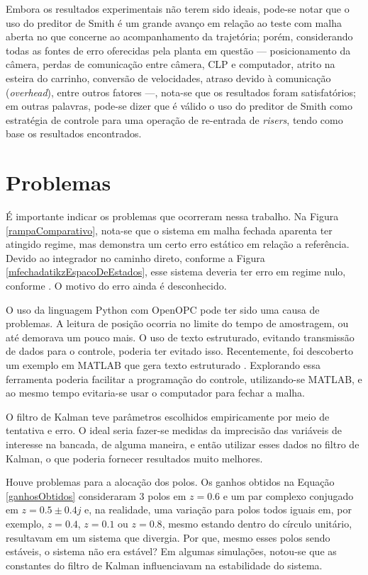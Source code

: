 Embora os resultados experimentais não terem sido ideais, pode-se notar que o uso do preditor de Smith é um grande avanço em relação ao teste com malha aberta no que concerne ao acompanhamento da trajetória; porém, considerando todas as fontes de erro oferecidas pela planta em questão --- posicionamento da câmera, perdas de comunicação entre câmera, CLP e computador, atrito na esteira do carrinho, conversão de velocidades, atraso devido à comunicação (\textit{overhead}), entre outros fatores ---, nota-se que os resultados foram satisfatórios; em outras palavras, pode-se dizer que é válido o uso do preditor de Smith como estratégia de controle para uma operação de re-entrada de \textit{risers}, tendo como base os resultados encontrados.

\section{Problemas}
É importante indicar os problemas que ocorreram nessa trabalho. Na Figura \ref{rampaComparativo}, nota-se que o sistema em malha fechada aparenta ter atingido regime, mas demonstra um certo erro estático em relação a referência. Devido ao integrador no caminho direto, conforme a Figura \ref{mfechadatikzEspacoDeEstados}, esse sistema deveria ter erro em regime nulo, conforme \cite{OgataDiscrete:1995}. O motivo do erro ainda é desconhecido.

O uso da linguagem Python com OpenOPC pode ter sido uma causa de problemas. A leitura de posição ocorria no limite do tempo de amostragem, ou até demorava um pouco mais. O uso de texto estruturado, evitando transmissão de dados para o controle, poderia ter evitado isso. Recentemente, foi descoberto um exemplo em MATLAB que gera texto estruturado \cite{stGeneration}. Explorando essa ferramenta poderia facilitar a programação do controle, utilizando-se MATLAB, e ao mesmo tempo evitaria-se usar o computador para fechar a malha.

O filtro de Kalman teve parâmetros escolhidos empiricamente por meio de tentativa e erro. O ideal seria fazer-se medidas da imprecisão das variáveis de interesse na bancada, de alguma maneira, e então utilizar esses dados no filtro de Kalman, o que poderia fornecer resultados muito melhores.

Houve problemas para a alocação dos polos. Os ganhos obtidos na Equação \ref{ganhosObtidos} consideraram 3 polos em $z=0.6$ e um par complexo conjugado em $z=0.5\pm 0.4j$ e, na realidade, uma variação para polos todos iguais em, por exemplo, $z=0.4$, $z=0.1$ ou $z=0.8$, mesmo estando dentro do círculo unitário, resultavam em um sistema que divergia. Por que, mesmo esses polos sendo estáveis, o sistema não era estável? Em algumas simulações, notou-se que as constantes do filtro de Kalman influenciavam na estabilidade do sistema.


